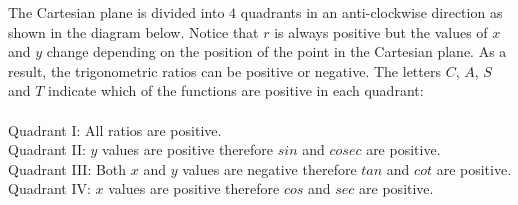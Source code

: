 The Cartesian plane is divided into $4$ quadrants in an anti-clockwise direction as shown in the diagram below. Notice that $r$ is always positive but the values of $x$ and $y$ change depending on the position of the point in the Cartesian plane. As a result, the trigonometric ratios can be positive or negative. The letters $C$, $A$, $S$ and $T$ indicate which of the functions are positive in each quadrant: \\
\\
Quadrant I: All ratios are positive.\\
Quadrant II: $y$ values are positive therefore $sin$ and $cosec$ are positive.\\
Quadrant III: Both $x$ and $y$ values are negative therefore $tan$ and $cot$ are positive. \\
Quadrant IV: $x$ values are positive therefore $cos$ and $sec$ are positive.\par


